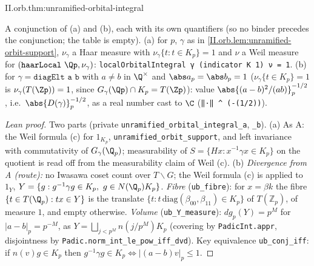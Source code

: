 \begin{theorem}
\end{theorem}
\begin{tfformal}{II.orb.thm:unramified-orbital-integral}
\begin{tffidelity}
A conjunction of (a) and (b), each with its own quantifiers (so no binder precedes the conjunction; the table is empty). (a) for $p$, $\gamma$ as in \cref{II.orb.lem:unramified-orbit-support}, $\nu_\gamma$ a Haar measure with $\nu_\gamma\{t:t\in K_p\}=1$ and $\nu$ a Weil measure for $(\texttt{haarLocal}\ \Qp,\nu_\gamma)$: \texttt{localOrbitalIntegral γ (indicator K 1) ν = 1}. (b) for $\gamma=\texttt{diagElt a b}$ with $a\ne b$ in $\Q^\times$ and $\abs a_p=\abs b_p=1$ ($\nu_\gamma\{t\in K_p\}=1$ is $\nu_\gamma(T(\Zp))=1$, since $G_\gamma(\Qp)\cap K_p=T(\Zp)$): value $\abs{(a-b)^2/(ab)}_p^{-1/2}$, i.e.\ $\abs{D(\gamma)}_p^{-1/2}$, as a real number cast to $\C$ (\texttt{‖·‖ \^{} (-(1/2))}).
\end{tffidelity}
\end{tfformal}
\begin{proof}[Lean proof]
Two parts (private \texttt{unramified\_orbital\_integral\_a}, \texttt{\_b}). (a) As A: the Weil formula (c) for $1_{K_p}$, \texttt{unramified\_orbit\_support}, and left invariance with commutativity of $G_\gamma(\Q_p)$; measurability of $S=\{Hx:x^{-1}\gamma x\in K_p\}$ on the quotient is read off from the measurability claim of Weil (c). (b) \emph{Divergence from A (route):} no Iwasawa coset count over $T\backslash G$; the Weil formula (c) is applied to $1_Y$, $Y=\{g:g^{-1}\gamma g\in K_p,\ g\in N(\Q_p)K_p\}$. \emph{Fibre} (\texttt{ub\_fibre}): for $x=\beta k$ the fibre $\{t\in T(\Q_p):tx\in Y\}$ is the translate $\{t:t\,\mathrm{diag}(\beta_{00},\beta_{11})\in K_p\}$ of $T(\mathbb Z_p)$, of measure $1$, and empty otherwise. \emph{Volume} (\texttt{ub\_Y\_measure}): $dg_p(Y)=p^M$ for $|a-b|_p=p^{-M}$, as $Y=\bigsqcup_{j<p^M}n(j/p^M)K_p$ (covering by \texttt{PadicInt.appr}, disjointness by \texttt{Padic.norm\_int\_le\_pow\_iff\_dvd}). Key equivalence \texttt{ub\_conj\_iff}: if $n(v)g\in K_p$ then $g^{-1}\gamma g\in K_p\iff|(a-b)v|_p\le1$.
\end{proof}


